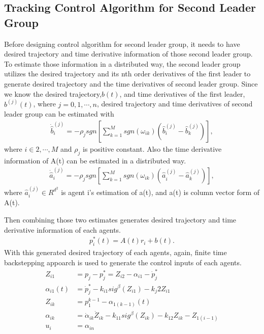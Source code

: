 \subsection{Tracking Control Algorithm for Second Leader Group} \label{Tracking_Control_Algorithm_Second_Leader_Group}
 Before designing control algorithm for second leader group, it needs to have desired trajectory and time derivative information of those second leader group. To estimate those information in a distributed way, the second leader group utilizes the desired trajectory and its nth order derivatives of the first leader to generate desired trajectory and the time derivatives of second leader group. Since we know the desired trajectory,$b(t)$, and time derivatives of the first leader,$b^{(j)}(t)$, where $j = 0,1, \cdots, n$, desired trajectory and time derivatives of second leader group can be estimated with
 \begin{align*}
    \dot {\hat b}_i^{(j)} = -\rho_j sgn[\sum_{k=1}^{M} sgn(\omega_{ik})(\hat b_i^{(j)} - \hat b_k^{(j)})],
 \end{align*} where $i \in {2, \cdots, M}$ and $\rho_j$ is positive constant.
Also the time derivative information of A(t) can be estimated in a distributed way.
\begin{align*}
    \dot {\hat a}_i^{(j)} = -\rho_j sgn[\sum_{k=1}^{M} sgn(\omega_{ik})(\hat a_i^{(j)} - \hat a_k^{(j)})],
 \end{align*} where $\hat a_i^{(j)} \in R^{d^2}$ is agent i's estimation of a(t), and a(t) is column vector form of A(t). 

 Then combining those two estimates generates desired trajectory and time derivative information of each agents. 
 \begin{align*}
    p_i^* (t) = A(t) r_i + b(t).
 \end{align*} With this generated desired trajectory of each agents, again, finite time backstepping appoarch is used to generate the control inputs of each agents. 
 \begin{align*}
    Z_{i1} &= p_j - p_j^* = Z_{i2} - \alpha_{i1} - \dot p_j^*\\
    \alpha_{i1} (t) &= \dot p_j^{*} - k_{i1} sig ^{\beta}(Z_{i1}) - k_j2 Z_{i1}\\
    Z_{ik} &= p_1^{k-1} - \alpha_{1(k-1)} (t)\\
    \alpha_{ik} &=  \dot \alpha_{ik} \dot Z_{ik} - k_{11} sig^{\beta}(Z_{ik}) - k_{12} Z_{ik} - Z_{1(i-1)} \\
    u_i &= \alpha_{in}
\end{align*} 
